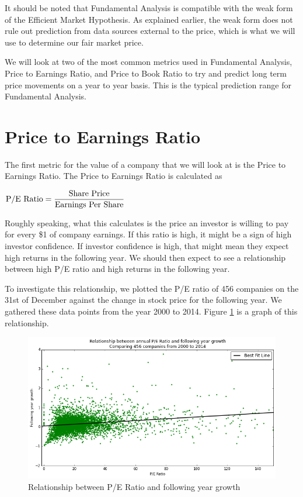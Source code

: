 \documentclass{report}
\begin{document}
It should be noted that Fundamental Analysis is compatible with the weak form of the Efficient Market Hypothesis. As explained earlier, the weak form does not rule out prediction from data sources external to the price, which is what we will use to determine our fair market price.

We will look at two of the most common metrics used in Fundamental Analysis, Price to Earnings Ratio, and Price to Book Ratio to try and predict long term price movements on a year to year basis. This is the typical prediction range for Fundamental Analysis.

\section{Price to Earnings Ratio}

The first metric for the value of a company that we will look at is the Price to Earnings Ratio. The Price to Earnings Ratio is calculated as

\begin{math}
  \\
	\text{P/E Ratio} = \dfrac{\text{Share Price}}{\text{Earnings Per Share}}
	\\
\end{math}

Roughly speaking, what this calculates is the price an investor is willing to pay for every \$1 of company earnings. If this ratio is high, it might be a sign of high investor confidence. If investor confidence is high, that might mean they expect high returns in the following year. We should then expect to see a relationship between high P/E ratio and high returns in the following year.

To investigate this relationship, we plotted the P/E ratio of 456 companies on the 31st of December against the change in stock price for the following year. We gathered these data points from the year 2000 to 2014. Figure \ref{fig:pe-abs} is a graph of this relationship.

\begin{figure}[H]
	\caption{Relationship between P/E Ratio and following year growth}
	\centerline{\includegraphics[width=\textwidth]{vis/pe-ratio-abs.png}}
	\label{fig:pe-abs}
\end{figure}
\end{document}
